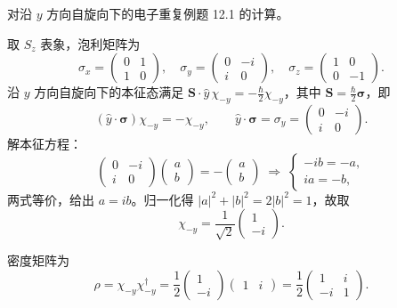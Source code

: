 \begin{question}
对沿 $y$ 方向自旋向下的电子重复例题 12.1 的计算。
\end{question}
\begin{solution}
取 $S_z$ 表象，泡利矩阵为
\[
\sigma_x = \begin{pmatrix}0&1\\1&0\end{pmatrix},\quad
\sigma_y = \begin{pmatrix}0&-i\\i&0\end{pmatrix},\quad
\sigma_z = \begin{pmatrix}1&0\\0&-1\end{pmatrix}.
\]
沿 $y$ 方向自旋向下的本征态满足 $\mathbf S\cdot\hat y\,\chi_{-y} = -\frac{\hbar}{2}\chi_{-y}$，其中 $\mathbf S = \frac{\hbar}{2}\boldsymbol\sigma$，即
\[
(\hat y\cdot\boldsymbol\sigma)\chi_{-y} = -\chi_{-y},\qquad
\hat y\cdot\boldsymbol\sigma = \sigma_y = \begin{pmatrix}0&-i\\i&0\end{pmatrix}.
\]
解本征方程：
\[
\begin{pmatrix}0&-i\\i&0\end{pmatrix}\begin{pmatrix}a\\b\end{pmatrix} = -\begin{pmatrix}a\\b\end{pmatrix}
\;\Longrightarrow\;
\begin{cases}
-ib = -a,\\
ia = -b,
\end{cases}
\]
两式等价，给出 $a = ib$。归一化得 $|a|^2+|b|^2 = 2|b|^2 = 1$，故取
\[
\chi_{-y} = \frac{1}{\sqrt{2}}\begin{pmatrix}1\\-i\end{pmatrix}.
\]

密度矩阵为
\[
\rho = \chi_{-y}\chi_{-y}^\dagger
= \frac{1}{2}\begin{pmatrix}1\\-i\end{pmatrix}\begin{pmatrix}1&i\end{pmatrix}
= \frac{1}{2}\begin{pmatrix}1 & i\\ -i & 1\end{pmatrix}.
\]


\end{solution}
